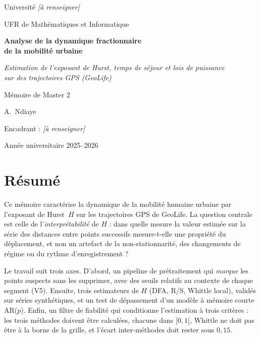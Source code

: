 \documentclass[12pt,a4paper]{report}
\theoremstyle{definition}
\begin{document}
\begin{titlepage}
\centering
\vspace*{1.5cm}
{\large Université \textit{[à renseigner]}\par}
{\large UFR de Mathématiques et Informatique\par}
\vspace{2.5cm}
{\LARGE\bfseries Analyse de la dynamique fractionnaire\\de la mobilité urbaine\par}
\vspace{0.8cm}
{\large\itshape Estimation de l'exposant de Hurst, temps de séjour et lois de puissance\\
sur des trajectoires GPS (GeoLife)\par}
\vspace{2cm}
{\large Mémoire de Master 2\par}
\vspace{1cm}
{\large A.~Ndiaye\par}
\vfill
{\large Encadrant : \textit{[à renseigner]}\par}
\vspace{1cm}
{\large Année universitaire 2025--2026\par}
\end{titlepage}


\chapter*{Résumé}

Ce mémoire caractérise la dynamique de la mobilité humaine urbaine par l'exposant de
Hurst~$H$ sur les trajectoires GPS de GeoLife. La question centrale est celle de
l'\emph{interprétabilité} de $H$ : dans quelle mesure la valeur estimée sur la série des
distances entre points successifs mesure-t-elle une propriété du déplacement, et non un
artefact de la non-stationnarité, des changements de régime ou du rythme d'enregistrement ?

Le travail suit trois axes. D'abord, un pipeline de prétraitement qui \emph{marque} les
points suspects sans les supprimer, avec des seuils relatifs au contexte de chaque segment
(V5). Ensuite, trois estimateurs de $H$ (DFA, R/S, Whittle local), validés sur séries
synthétiques, et un test de dépassement d'un modèle à mémoire courte AR($p$). Enfin, un
filtre de fiabilité qui conditionne l'estimation à trois critères : les trois méthodes
doivent être calculées, chacune dans $]0,1[$, Whittle ne doit pas être à la borne de la
grille, et l'écart inter-méthodes doit rester sous $0{,}15$.
\end{document}
